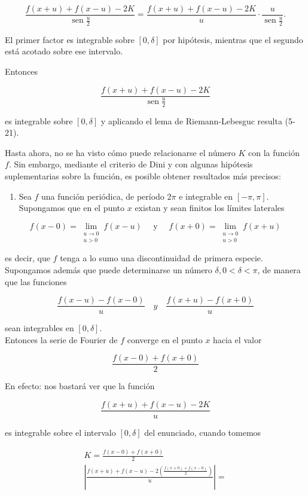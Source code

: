 \documentclass[10pt]{article}
\theoremstyle{plain}
\theoremstyle{definition}
\theoremstyle{remark}
\begin{document}
$$
\frac{f(x+u)+f(x-u)-2 K}{\operatorname{sen} \frac{u}{2}}=\frac{f(x+u)+f(x-u)-2 K}{u} \cdot \frac{u}{\operatorname{sen} \frac{u}{2}} .
$$

El primer factor es integrable sobre $[0, \delta]$ por hipótesis, mientras que el segundo está acotado sobre ese intervalo.

Entonces

$$
\frac{f(x+u)+f(x-u)-2 K}{\operatorname{sen} \frac{u}{2}}
$$

es integrable sobre $[0, \delta]$ y aplicando el lema de Riemann-Lebesguc resulta (5-21).

Hasta ahora, no se ha visto cómo puede relacionarse el número $K$ con la función $f$. Sin embargo, mediante el criterio de Dini y con algunas hipótesis suplementarias sobre la función, es posible obtener resultados más precisos:

\begin{enumerate}
  \item Sea $f$ una función periódica, de período $2 \pi$ e integrable en $[-\pi, \pi]$. Supongamos que en el punto $x$ existan y sean finitos los límites laterales
\end{enumerate}

$$
f(x-0)=\lim _{\substack{u \rightarrow 0 \\ u>0}} f(x-u) \quad \text { y } \quad f(x+0)=\lim _{\substack{u \rightarrow 0 \\ u>0}} f(x+u)
$$

es decir, que $f$ tenga a lo sumo una discontinuidad de primera especie.\\
Supongamos además que puede determinarse un número $\delta, 0<\delta<\pi$, de manera que las funciones

$$
\frac{f(x-u)-f(x-0)}{u} \quad y \quad \frac{f(x+u)-f(x+0)}{u}
$$

sean integrables en $[0, \delta]$.\\
Entonces la serie de Fourier de $f$ converge en el punto $x$ hacia el valor

$$
\frac{f(x-0)+f(x+0)}{2}
$$

En efecto: nos bastará ver que la función

$$
\frac{f(x+u)+f(x-u)-2 K}{u}
$$

es integrable sobre el intervalo $[0, \delta]$ del enunciado, cuando tomemos

$$
\begin{gathered}
K=\frac{f(x-0)+f(x+0)}{2} \\
\left|\frac{f(x+u)+f(x-u)-2\left(\frac{f(x+0)+f(x-0)}{2}\right)}{u}\right|=
\end{gathered}
$$
\end{document}
